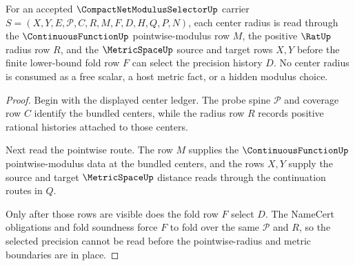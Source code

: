 \begin{theorem}
\label{thm:compact-net-modulus-selector-pointwise-radius-route}
For an accepted $\CompactNetModulusSelectorUp$ carrier $S=(X,Y,E,\mathcal{P},C,R,M,F,D,H,Q,P,N)$, each center radius is read through the $\ContinuousFunctionUp$ pointwise-modulus row $M$, the positive $\RatUp$ radius row $R$, and the $\MetricSpaceUp$ source and target rows $X,Y$ before the finite lower-bound fold row $F$ can select the precision history $D$. No center radius is consumed as a free scalar, a host metric fact, or a hidden modulus choice.
\end{theorem}
\begin{proof}
Begin with the displayed center ledger. The probe spine $\mathcal{P}$ and coverage row $C$ identify the bundled centers, while the radius row $R$ records positive rational histories attached to those centers.

Next read the pointwise route. The row $M$ supplies the $\ContinuousFunctionUp$ pointwise-modulus data at the bundled centers, and the rows $X,Y$ supply the source and target $\MetricSpaceUp$ distance reads through the continuation routes in $Q$.

Only after those rows are visible does the fold row $F$ select $D$. The NameCert obligations and fold soundness force $F$ to fold over the same $\mathcal{P}$ and $R$, so the selected precision cannot be read before the pointwise-radius and metric boundaries are in place.
\end{proof}

